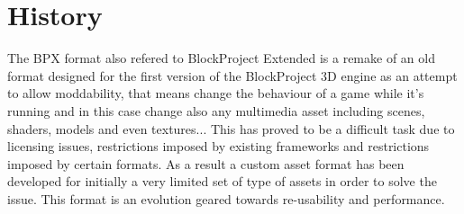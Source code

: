 \section{History}
The BPX format also refered to BlockProject Extended is a remake of an old format designed for the first version of the BlockProject 3D engine as an attempt to allow moddability, that means change the behaviour of a game while it's running and in this case change also any multimedia asset including scenes, shaders, models and even textures...\newline
This has proved to be a difficult task due to licensing issues, restrictions imposed by existing frameworks and restrictions imposed by certain formats.\newline
As a result a custom asset format has been developed for initially a very limited set of type of assets in order to solve the issue.\newline
This format is an evolution geared towards re-usability and performance.
